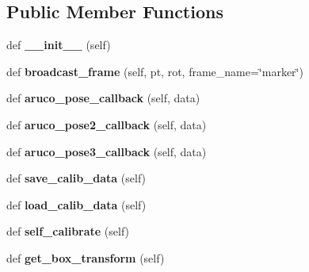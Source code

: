 \subsection*{Public Member Functions}
\begin{DoxyCompactItemize}
\item 
\hypertarget{classscripts_1_1camera__calib_1_1_baxter_eye_hand_calib_afdf72c1cbddb1032a9ca28175dccab5a}{}\label{classscripts_1_1camera__calib_1_1_baxter_eye_hand_calib_afdf72c1cbddb1032a9ca28175dccab5a} 
def {\bfseries \+\_\+\+\_\+init\+\_\+\+\_\+} (self)
\item 
\hypertarget{classscripts_1_1camera__calib_1_1_baxter_eye_hand_calib_a5c2fdba025d1127b89b2ca59e92143ff}{}\label{classscripts_1_1camera__calib_1_1_baxter_eye_hand_calib_a5c2fdba025d1127b89b2ca59e92143ff} 
def {\bfseries broadcast\+\_\+frame} (self, pt, rot, frame\+\_\+name=\char`\"{}marker\char`\"{})
\item 
\hypertarget{classscripts_1_1camera__calib_1_1_baxter_eye_hand_calib_ab19841f4843afd3f7fc1b94da153bcfb}{}\label{classscripts_1_1camera__calib_1_1_baxter_eye_hand_calib_ab19841f4843afd3f7fc1b94da153bcfb} 
def {\bfseries aruco\+\_\+pose\+\_\+callback} (self, data)
\item 
\hypertarget{classscripts_1_1camera__calib_1_1_baxter_eye_hand_calib_aea563902be3f5e276d47015a28abb44c}{}\label{classscripts_1_1camera__calib_1_1_baxter_eye_hand_calib_aea563902be3f5e276d47015a28abb44c} 
def {\bfseries aruco\+\_\+pose2\+\_\+callback} (self, data)
\item 
\hypertarget{classscripts_1_1camera__calib_1_1_baxter_eye_hand_calib_a94e2bd3ddf9d53cf5d15541482bc8d79}{}\label{classscripts_1_1camera__calib_1_1_baxter_eye_hand_calib_a94e2bd3ddf9d53cf5d15541482bc8d79} 
def {\bfseries aruco\+\_\+pose3\+\_\+callback} (self, data)
\item 
\hypertarget{classscripts_1_1camera__calib_1_1_baxter_eye_hand_calib_a2f92f6b1e6a428173d6a3a301ea716fd}{}\label{classscripts_1_1camera__calib_1_1_baxter_eye_hand_calib_a2f92f6b1e6a428173d6a3a301ea716fd} 
def {\bfseries save\+\_\+calib\+\_\+data} (self)
\item 
\hypertarget{classscripts_1_1camera__calib_1_1_baxter_eye_hand_calib_aba48021622c2d0765adc64f24c570c64}{}\label{classscripts_1_1camera__calib_1_1_baxter_eye_hand_calib_aba48021622c2d0765adc64f24c570c64} 
def {\bfseries load\+\_\+calib\+\_\+data} (self)
\item 
\hypertarget{classscripts_1_1camera__calib_1_1_baxter_eye_hand_calib_a757e472952ec208820d9c6773f32e42a}{}\label{classscripts_1_1camera__calib_1_1_baxter_eye_hand_calib_a757e472952ec208820d9c6773f32e42a} 
def {\bfseries self\+\_\+calibrate} (self)
\item 
\hypertarget{classscripts_1_1camera__calib_1_1_baxter_eye_hand_calib_a903718477ffc4bc61713b07722ea95b6}{}\label{classscripts_1_1camera__calib_1_1_baxter_eye_hand_calib_a903718477ffc4bc61713b07722ea95b6} 
def {\bfseries get\+\_\+box\+\_\+transform} (self)
\end{DoxyCompactItemize}
